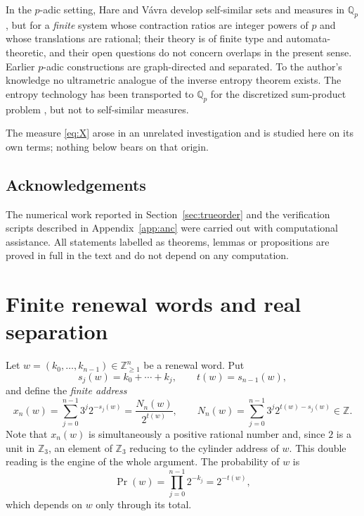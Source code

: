 \documentclass[11pt,reqno]{amsart}
\theoremstyle{plain}
\theoremstyle{definition}
\theoremstyle{remark}
\newcommand{\Zthree}{\mathbb{Z}_3}
\newcommand{\Prob}{\operatorname{Pr}}
\begin{document}
In the $p$-adic setting, Hare and V\'avra \cite{HareVavra24} develop
self-similar sets and measures in $\mathbb Q_p$, but for a \emph{finite}
system whose contraction ratios are integer powers of $p$ and whose
translations are rational; their theory is of finite type and
automata-theoretic, and their open questions do not concern overlaps in the
present sense. Earlier $p$-adic constructions \cite{AbramLagarias14} are
graph-directed and separated. To the author's knowledge no ultrametric
analogue of the inverse entropy theorem exists. The entropy technology has
been transported to $\mathbb Q_p$ for the discretized sum-product problem
\cite{SalehiGolsefidy}, but not to self-similar measures.

The measure \eqref{eq:X} arose in an unrelated investigation and is studied
here on its own terms; nothing below bears on that origin.

\subsection{Acknowledgements}
The numerical work reported in Section~\ref{sec:trueorder} and the
verification scripts described in Appendix~\ref{app:anc} were carried out
with computational assistance. All statements labelled as theorems, lemmas
or propositions are proved in full in the text and do not depend on any
computation.

\section{Finite renewal words and real separation}\label{sec:words}

Let $w=(k_0,\ldots,k_{n-1})\in\mathbb Z_{\ge1}^n$ be a renewal word. Put
\begin{equation}
s_j(w)=k_0+\cdots+k_j,\qquad t(w)=s_{n-1}(w),
\label{eq:partials}
\end{equation}
and define the \emph{finite address}
\begin{equation}
x_n(w)=\sum_{j=0}^{n-1}3^j2^{-s_j(w)}=\frac{N_n(w)}{2^{t(w)}},
\qquad
N_n(w)=\sum_{j=0}^{n-1}3^j2^{t(w)-s_j(w)}\in\mathbb Z .
\label{eq:address}
\end{equation}
Note that $x_n(w)$ is simultaneously a positive rational number and, since
$2$ is a unit in $\Zthree$, an element of $\Zthree$ reducing to the cylinder
address of $w$. This double reading is the engine of the whole argument.
The probability of $w$ is
\begin{equation}
\Prob(w)=\prod_{j=0}^{n-1}2^{-k_j}=2^{-t(w)} ,
\label{eq:wordprob}
\end{equation}
which depends on $w$ only through its total.
\end{document}
